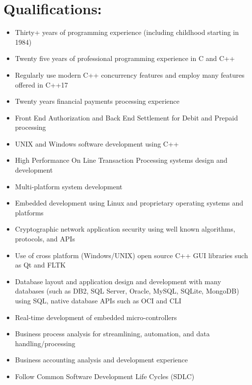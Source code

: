 \documentclass[10pt]{report}
\begin{document}

\vspace{-5em}

\section*{Qualifications:}

\begin{itemize}

\item Thirty+ years of programming experience (including childhood starting in 1984)
\item Twenty five years of professional programming experience in C and C++
\item Regularly use modern C++ concurrency features and employ many features offered in C++17 
\item Twenty years financial payments processing experience
\item Front End Authorization and Back End Settlement for Debit and Prepaid processing
\item UNIX and Windows software development using C++
\item High Performance On Line Transaction Processing systems design and development
\item Multi-platform system development
\item Embedded development using Linux and proprietary operating systems and platforms
\item Cryptographic network application security using well known algorithms, protocols, and APIs
\item Use of cross platform (Windows/UNIX) open source C++ GUI libraries such as Qt and FLTK
\item Database layout and application design and development with many databases (such as DB2, SQL Server, Oracle, MySQL, SQLite, MongoDB) using SQL, native database APIs such as OCI and CLI
\item Real-time development of embedded micro-controllers
\item Business process analysis for streamlining, automation, and data handling/processing
\item Business accounting analysis and development experience
\item Follow Common Software Development Life Cycles (SDLC)
\end{itemize}
\end{document}

